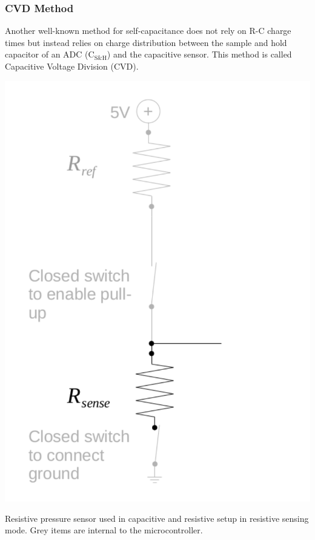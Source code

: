 \documentclass{sigchi-ext}
\begin{document}
\subsubsection{CVD Method}
Another well-known method for self-capacitance does not rely on R-C charge times
but instead relies on charge distribution between the sample and hold capacitor
of an ADC ($\textrm{C}_{\textrm{S\&H}}$) and the capacitive sensor. This method
is called Capacitive Voltage Division (CVD).

\begin{marginfigure}
\begin{minipage}{\marginparwidth}
\centering
\includegraphics[width=0.9\columnwidth]{figures/cap_res_setup_res}
\caption{Resistive pressure sensor used in capacitive and resistive setup in
resistive sensing mode. Grey items are internal to the
microcontroller.}~\label{fig:cap_res_setup_res}
\end{minipage}
\end{marginfigure}
\end{document}
